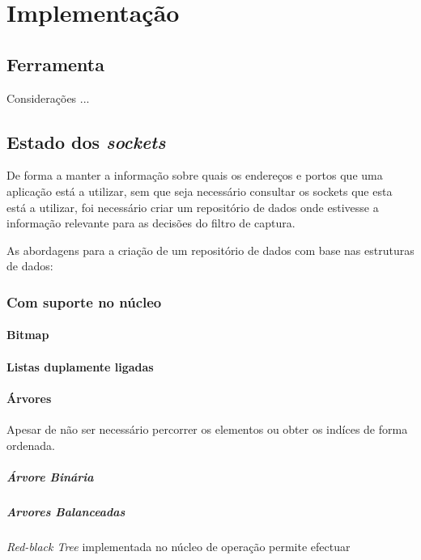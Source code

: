 \chapter{Implementação}
\label{cap:Implementacao}



\section{Ferramenta}
Considerações ...

\section{Estado dos \textit{sockets}}

De forma a manter a informação sobre quais os endereços e portos que uma aplicação está a utilizar, sem que seja necessário consultar os sockets que esta está a utilizar, foi necessário criar um repositório de dados onde estivesse a informação relevante para as decisões do filtro de captura.

As abordagens para a criação de um repositório de dados com base nas estruturas de dados:
\subsection{Com suporte no núcleo}
\subsubsection{Bitmap}
\subsubsection{Listas duplamente ligadas}
\subsubsection{Árvores}

Apesar de não ser necessário percorrer os elementos ou obter os indíces de forma ordenada. 

\paragraph{Árvore Binária}


\paragraph{Arvores Balanceadas}
\textit{Red-black Tree} implementada no núcleo de operação permite efectuar

